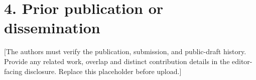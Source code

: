 \documentclass[11pt]{article}
\begin{document}
\section*{4. Prior publication or dissemination}
[The authors must verify the publication, submission, and public-draft history. Provide any related work, overlap and distinct contribution details in the editor-facing disclosure. Replace this placeholder before upload.]
\end{document}
